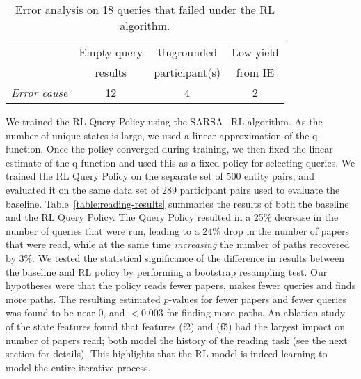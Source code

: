   \begin{table}[t!]
  \begin{small}
  \begin{center}
  \begin{tabular}{l|ccc}
    &Empty query&Ungrounded&Low yield\\
    & results & participant(s) & from IE \\
    \hline
    \emph{Error cause}& 12&4&2
  \end{tabular}
  \end{center}
  \end{small}
  \vspace{-2mm}
  \caption{Error analysis on 18 queries that failed under the RL algorithm.}
  \vspace{-4mm}
  \label{table:policyerroranalysys}
\end{table}


We trained the RL Query Policy using the SARSA~\cite{sutton1998reinforcement} RL algorithm.  As the number of unique states is large, we used a linear approximation of the q-function.  Once the policy converged during training, we then fixed the linear estimate of the q-function and used this as a fixed policy for selecting queries.  
We trained the RL Query Policy on the separate set of 500 entity pairs, and 
evaluated it on the same data set of 289 participant pairs used to evaluate the baseline.
Table~\ref{table:reading-results} summaries the results of both the baseline and the RL Query Policy.  
The Query Policy resulted in a 25\% decrease in the number of queries that were run, leading to a 24\% drop in the number of papers that were read, while at the same time {\em increasing} the number of paths recovered by 3\%.
We tested the statistical significance of the difference in results between the baseline and RL policy by performing a bootstrap resampling test. Our hypotheses were that the policy reads fewer papers, makes fewer queries and finds more paths. The resulting estimated $p$-values for fewer papers and fewer queries was found to be near 0, and $< 0.003$ for finding more paths.
An ablation study of the state features found that features (f2) and (f5) had the largest impact on number of papers read; both model the history of the reading task (see the next section for details).  This highlights that the RL model is indeed learning to model the entire iterative process.


